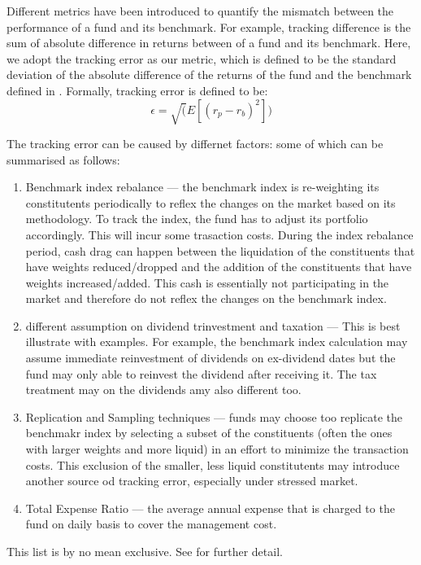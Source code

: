 Different metrics have been introduced to quantify the mismatch between the performance of a fund and its benchmark. For example, tracking difference is the sum of absolute difference in returns between of a fund and its benchmark. Here, we adopt the tracking error as our metric, which is defined to be the standard deviation of the absolute difference of the returns of the fund and the benchmark defined in \cite{BJ13}. Formally, tracking error is defined to be:
\begin{equation}
  \epsilon = \sqrt(E[(r_p - r_b)^2])
\end{equation}

The tracking error can be caused by differnet factors: some of which can be summarised as follows:
\begin{enumerate}
\item Benchmark index rebalance --- the benchmark index is re-weighting its constitutents periodically to reflex the changes on the market based on its methodology. To track the index, the fund has to adjust its portfolio accordingly. This will incur some trasaction costs. During the index rebalance period, cash drag can happen between the liquidation of the constituents that have weights reduced/dropped and the addition of the constituents that have weights increased/added. This cash is essentially not participating in the market and therefore do not reflex the changes on the benchmark index.
\item different assumption on dividend trinvestment and taxation --- This is best illustrate with examples. For example, the benchmark index calculation may assume immediate reinvestment of dividends on ex-dividend dates but the fund may only able to reinvest the dividend after receiving it. The tax treatment may on the dividends amy also different too.
\item Replication and Sampling techniques --- funds may choose too replicate the benchmakr index by selecting a subset of the constituents (often the ones with larger weights and more liquid) in an effort to minimize the transaction costs. This exclusion of the smaller, less liquid constitutents may introduce another source od tracking error, especially under stressed market.
\item Total Expense Ratio --- the average annual expense that is charged to the fund on daily basis to cover the management cost.
\end{enumerate}
This list is by no mean exclusive. See \cite{} for further detail.

